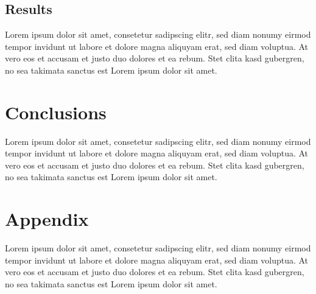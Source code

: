 \documentclass{article}
\begin{document}
\subsection{Results}
Lorem ipsum dolor sit amet, consetetur sadipscing elitr, sed diam nonumy eirmod
tempor invidunt ut labore et dolore magna aliquyam erat, sed diam voluptua. At
vero eos et accusam et justo duo dolores et ea rebum. Stet clita kasd gubergren,
no sea takimata sanctus est Lorem ipsum dolor sit amet.


\section{Conclusions}
Lorem ipsum dolor sit amet, consetetur sadipscing elitr, sed diam nonumy eirmod
tempor invidunt ut labore et dolore magna aliquyam erat, sed diam voluptua. At
vero eos et accusam et justo duo dolores et ea rebum. Stet clita kasd gubergren,
no sea takimata sanctus est Lorem ipsum dolor sit amet.


\section{Appendix}
Lorem ipsum dolor sit amet, consetetur sadipscing elitr, sed diam nonumy eirmod
tempor invidunt ut labore et dolore magna aliquyam erat, sed diam voluptua. At
vero eos et accusam et justo duo dolores et ea rebum. Stet clita kasd gubergren,
no sea takimata sanctus est Lorem ipsum dolor sit amet.
\end{document}
